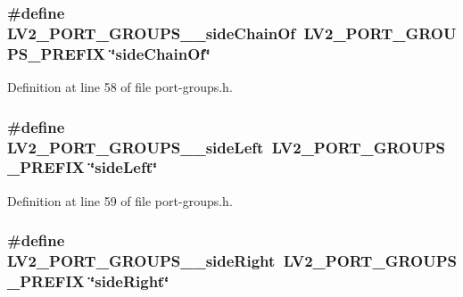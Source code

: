 \subsubsection[{\texorpdfstring{L\+V2\+\_\+\+P\+O\+R\+T\+\_\+\+G\+R\+O\+U\+P\+S\+\_\+\+\_\+side\+Chain\+Of}{LV2_PORT_GROUPS__sideChainOf}}]{\setlength{\rightskip}{0pt plus 5cm}\#define L\+V2\+\_\+\+P\+O\+R\+T\+\_\+\+G\+R\+O\+U\+P\+S\+\_\+\+\_\+side\+Chain\+Of~{\bf L\+V2\+\_\+\+P\+O\+R\+T\+\_\+\+G\+R\+O\+U\+P\+S\+\_\+\+P\+R\+E\+F\+IX} \char`\"{}side\+Chain\+Of\char`\"{}}\hypertarget{port-groups_8h_a2f34caa5ab7e491a78a228c5a8c4e4d4}{}\label{port-groups_8h_a2f34caa5ab7e491a78a228c5a8c4e4d4}


Definition at line 58 of file port-\/groups.\+h.

\subsubsection[{\texorpdfstring{L\+V2\+\_\+\+P\+O\+R\+T\+\_\+\+G\+R\+O\+U\+P\+S\+\_\+\+\_\+side\+Left}{LV2_PORT_GROUPS__sideLeft}}]{\setlength{\rightskip}{0pt plus 5cm}\#define L\+V2\+\_\+\+P\+O\+R\+T\+\_\+\+G\+R\+O\+U\+P\+S\+\_\+\+\_\+side\+Left~{\bf L\+V2\+\_\+\+P\+O\+R\+T\+\_\+\+G\+R\+O\+U\+P\+S\+\_\+\+P\+R\+E\+F\+IX} \char`\"{}side\+Left\char`\"{}}\hypertarget{port-groups_8h_aa3e920771e64b79d71d0188b69314a60}{}\label{port-groups_8h_aa3e920771e64b79d71d0188b69314a60}


Definition at line 59 of file port-\/groups.\+h.

\subsubsection[{\texorpdfstring{L\+V2\+\_\+\+P\+O\+R\+T\+\_\+\+G\+R\+O\+U\+P\+S\+\_\+\+\_\+side\+Right}{LV2_PORT_GROUPS__sideRight}}]{\setlength{\rightskip}{0pt plus 5cm}\#define L\+V2\+\_\+\+P\+O\+R\+T\+\_\+\+G\+R\+O\+U\+P\+S\+\_\+\+\_\+side\+Right~{\bf L\+V2\+\_\+\+P\+O\+R\+T\+\_\+\+G\+R\+O\+U\+P\+S\+\_\+\+P\+R\+E\+F\+IX} \char`\"{}side\+Right\char`\"{}}\hypertarget{port-groups_8h_ab8d89de3d5a0313fec3f860c565e2dd4}{}\label{port-groups_8h_ab8d89de3d5a0313fec3f860c565e2dd4}


